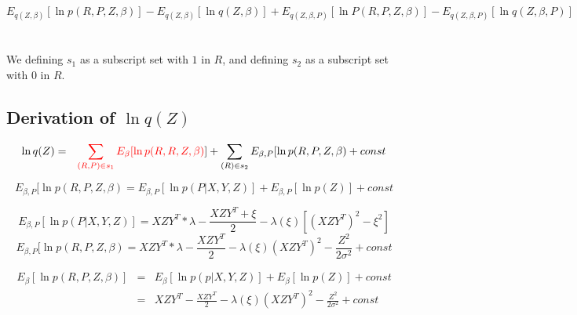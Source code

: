 \documentclass[11pt]{report}
\begin{document}
\begin{equation}
    E_{q(Z,\beta)}[\ln p(R,P,Z,\beta)] -E_{q(Z,\beta)}[\ln q(Z,\beta)] + E_{q(Z,\beta ,P)}[\ln P(R,P,Z,\beta)] -E_{q(Z,\beta,P)}[\ln q(Z,\beta,P)]
\end{equation}
\\
\\
We defining $s_1$ as a subscript set with $1$ in $R$, and defining $s_2$ as a subscript set with $0$ in $R$.



\subsection{Derivation of $\ln q(Z)$}

\begin{eqnarray*}
    \ln q(Z) 
    &=& \textcolor{red}{\sum_{(R,P)\in s_1}E_{\beta}[\ln p(R,R,Z,\beta)}] + \sum_{(R)\in s_2}E_{\beta,P}[\ln p(R,P,Z,\beta) + const %
\end{eqnarray*}

\begin{equation}
    E_{\beta,P}[\ln p(R,P,Z,\beta) = E_{\beta,P}[\ln p(P|X,Y,Z)]+E_{\beta,P}[\ln p(Z)]+const
\end{equation}

\begin{equation}
    E_{\beta,P}[\ln p(P|X,Y,Z)]=XZY^{T}*\lambda - \frac{XZY^{T}+\xi}{2}-\lambda(\xi)[(XZY^{T})^2-\xi^2]
\end{equation}
\begin{equation}
    E_{\beta,P}[\ln p(R,P,Z,\beta)= XZY^{T}*\lambda - \frac{XZY^{T}}{2}-\lambda(\xi)(XZY^{T})^2-\frac{Z^2}{2\sigma^2}+const
\end{equation}

\begin{eqnarray*}
E_{\beta}[\ln p(R,P,Z,\beta)] &=& E_{\beta}[\ln p(p|X,Y,Z)]+E_{\beta}[\ln p(Z)]+const \\
&=& XZY^{T} - \frac{XZY^{T}}{2}-\lambda(\xi)(XZY^{T})^2-\frac{Z^2}{2\sigma^2}+const
\end{eqnarray*}
\end{document}
